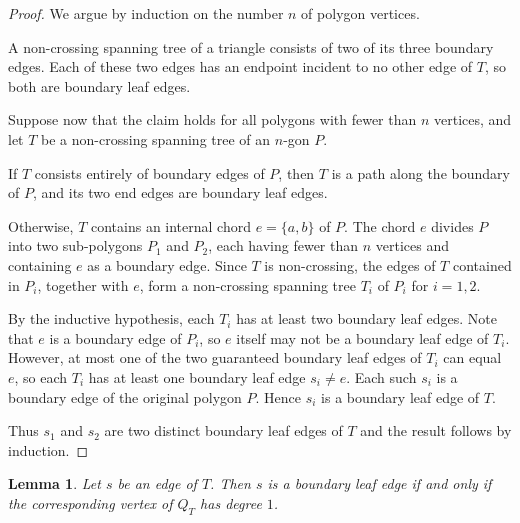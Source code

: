 \documentclass[12pt]{amsart}
\newtheorem{lem}[thm]{Lemma}
\theoremstyle{definition}
\theoremstyle{remark}
\numberwithin{equation}{section}
\begin{document}
\begin{proof}
We argue by induction on the number $n$ of polygon vertices.

A non-crossing spanning tree of a triangle consists of two of its three boundary edges. Each of these two edges has an endpoint incident to no other edge of $T$, so both are boundary leaf edges.

Suppose now that the claim holds for all polygons with fewer than $n$ vertices, and let $T$ be a non-crossing spanning tree of an $n$-gon $P$.

If $T$ consists entirely of boundary edges of $P$, then $T$ is a path along the boundary of $P$, and its two end edges are boundary leaf edges.

Otherwise, $T$ contains an internal chord $e = \{a, b\}$ of $P$. The chord $e$ divides $P$ into two sub-polygons $P_1$ and $P_2$, each having fewer than $n$ vertices and containing $e$ as a boundary edge. Since $T$ is non-crossing, the edges of $T$ contained in $P_i$, together with $e$, form a non-crossing spanning tree $T_i$ of $P_i$ for $i = 1, 2$.

By the inductive hypothesis, each $T_i$ has at least two boundary leaf edges. Note that $e$ is a boundary edge of $P_i$, so $e$ itself may not be a boundary leaf edge of $T_i$. However, at most one of the two guaranteed boundary leaf edges of $T_i$ can equal $e$, so each $T_i$ has at least one boundary leaf edge $s_i \neq e$. Each such $s_i$ is a boundary edge of the original polygon $P$. Hence $s_i$ is a boundary leaf edge of $T$.

Thus $s_1$ and $s_2$ are two distinct boundary leaf edges of $T$ and the result follows by induction.
\end{proof}

\begin{lem}\label{lem:degree-one-boundary-leaf}
Let \(s\) be an edge of \(T\). Then \(s\) is a boundary leaf edge if and only if the corresponding vertex of \(Q_T\) has degree \(1\). 
\end{lem}
\end{document}
